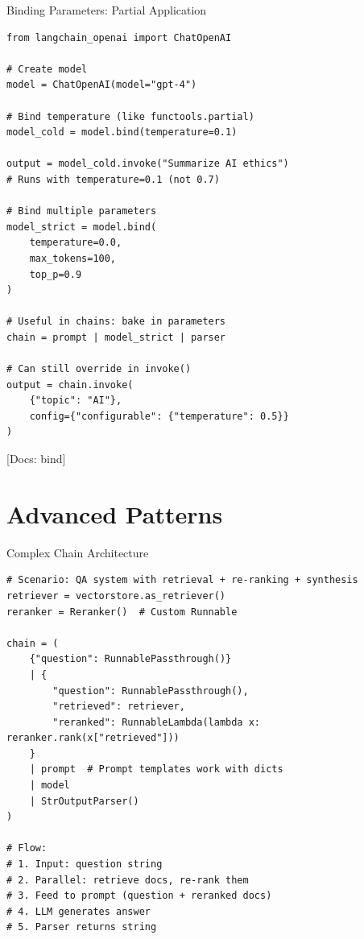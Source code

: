 \documentclass[aspectratio=169,11pt]{beamer}
\newcommand{\docref}[1]{{\scriptsize\color{docgray}[Docs: #1]}}
\begin{document}
\begin{frame}[fragile,shrink=3]{Binding Parameters: Partial Application}
  \begin{codebox}
\begin{lstlisting}
from langchain_openai import ChatOpenAI

# Create model
model = ChatOpenAI(model="gpt-4")

# Bind temperature (like functools.partial)
model_cold = model.bind(temperature=0.1)

output = model_cold.invoke("Summarize AI ethics")
# Runs with temperature=0.1 (not 0.7)

# Bind multiple parameters
model_strict = model.bind(
    temperature=0.0,
    max_tokens=100,
    top_p=0.9
)

# Useful in chains: bake in parameters
chain = prompt | model_strict | parser

# Can still override in invoke()
output = chain.invoke(
    {"topic": "AI"},
    config={"configurable": {"temperature": 0.5}}
)
\end{lstlisting}
  \end{codebox}

  \docref{bind}
\end{frame}

\section{Advanced Patterns}

\begin{frame}[fragile]{Complex Chain Architecture}
  \begin{codebox}
\begin{lstlisting}
# Scenario: QA system with retrieval + re-ranking + synthesis
retriever = vectorstore.as_retriever()
reranker = Reranker()  # Custom Runnable

chain = (
    {"question": RunnablePassthrough()}
    | {
        "question": RunnablePassthrough(),
        "retrieved": retriever,
        "reranked": RunnableLambda(lambda x: reranker.rank(x["retrieved"]))
    }
    | prompt  # Prompt templates work with dicts
    | model
    | StrOutputParser()
)

# Flow:
# 1. Input: question string
# 2. Parallel: retrieve docs, re-rank them
# 3. Feed to prompt (question + reranked docs)
# 4. LLM generates answer
# 5. Parser returns string
\end{lstlisting}
  \end{codebox}
\end{frame}
\end{document}
